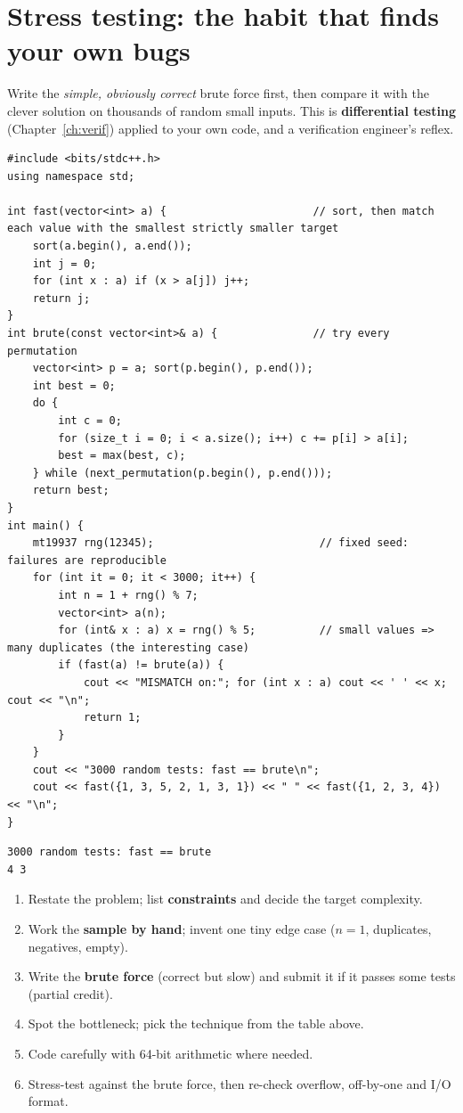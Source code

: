 \documentclass[10pt,a4paper,openany,oneside]{report}
\newcommand{\prio}[1]{\texorpdfstring{\ifcase#1\or{\color{gold}\ding{72}}\or{\color{gold}\ding{72}\ding{72}}\or{\color{gold}\ding{72}\ding{72}\ding{72}}\fi}{}}
\begin{document}
\section{Stress testing: the habit that finds your own bugs \prio{3}}
Write the \emph{simple, obviously correct} brute force first, then compare it with the clever solution on thousands of random small inputs. This is \textbf{differential testing} (Chapter~\ref{ch:verif}) applied to your own code, and a verification engineer's reflex.
\begin{lstlisting}[language={[11]C++},title={Stress test: greedy 'maximize greatness' vs. brute force over all permutations}]
#include <bits/stdc++.h>
using namespace std;

int fast(vector<int> a) {                       // sort, then match each value with the smallest strictly smaller target
    sort(a.begin(), a.end());
    int j = 0;
    for (int x : a) if (x > a[j]) j++;
    return j;
}
int brute(const vector<int>& a) {               // try every permutation
    vector<int> p = a; sort(p.begin(), p.end());
    int best = 0;
    do {
        int c = 0;
        for (size_t i = 0; i < a.size(); i++) c += p[i] > a[i];
        best = max(best, c);
    } while (next_permutation(p.begin(), p.end()));
    return best;
}
int main() {
    mt19937 rng(12345);                          // fixed seed: failures are reproducible
    for (int it = 0; it < 3000; it++) {
        int n = 1 + rng() % 7;
        vector<int> a(n);
        for (int& x : a) x = rng() % 5;          // small values => many duplicates (the interesting case)
        if (fast(a) != brute(a)) {
            cout << "MISMATCH on:"; for (int x : a) cout << ' ' << x; cout << "\n";
            return 1;
        }
    }
    cout << "3000 random tests: fast == brute\n";
    cout << fast({1, 3, 5, 2, 1, 3, 1}) << " " << fast({1, 2, 3, 4}) << "\n";
}
\end{lstlisting}
\begin{lstlisting}[style=out,title={Answer: captured output}]
3000 random tests: fast == brute
4 3
\end{lstlisting}
\begin{tipbox}
\begin{enumerate}[nosep]
\item Restate the problem; list \textbf{constraints} and decide the target complexity. \item Work the \textbf{sample by hand}; invent one tiny edge case ($n=1$, duplicates, negatives, empty).
\item Write the \textbf{brute force} (correct but slow) and submit it if it passes some tests (partial credit). \item Spot the bottleneck; pick the technique from the table above.
\item Code carefully with 64-bit arithmetic where needed. \item Stress-test against the brute force, then re-check overflow, off-by-one and I/O format.
\end{enumerate}
\end{tipbox}
\end{document}
